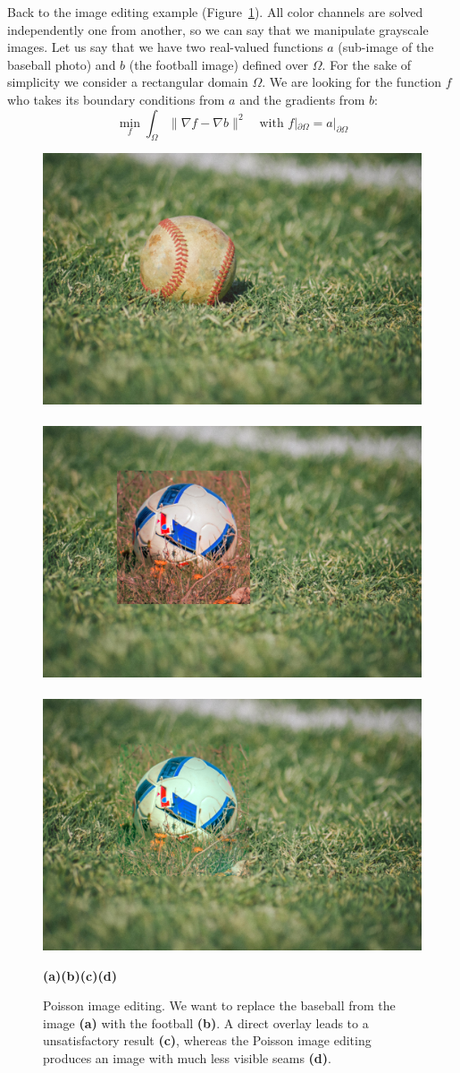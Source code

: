 \documentclass[notitlepage,oneside]{book}
\begin{document}
Back to the image editing example (Figure~\ref{fig:pie}). All color channels are solved independently one from another, so we can say that we manipulate grayscale images.
Let us say that we have two real-valued functions $a$ (sub-image of the baseball photo) and $b$ (the football image) defined over $\Omega$.
For the sake of simplicity we consider a rectangular domain $\Omega$.
We are looking for the function $f$ who takes its boundary conditions from $a$ and the gradients from $b$:
$$
\min\limits_{f} \int_\Omega \|\nabla f - \nabla b\|^2 \quad \text{with~} f|_{\partial\Omega} = a|_{\partial\Omega}
$$

\begin{figure}[b]
    \centering
    \includegraphics[width=.24\linewidth]{img/pie_baseball.png}~
    ~
    \includegraphics[width=.24\linewidth]{img/pie_overlay.png}~
    \includegraphics[width=.24\linewidth]{img/pie_poisson.png}
    \\
    \begin{flushleft}
    {\hspace{.18\linewidth}\textbf{(a)\hspace{.15\linewidth}(b)\hspace{.14\linewidth}(c)\hspace{.22\linewidth}(d)}}
    \end{flushleft}
    \caption{Poisson image editing. We want to replace the baseball from the image \textbf{(a)} with the football \textbf{(b)}. A direct overlay leads to a unsatisfactory result \textbf{(c)}, whereas the Poisson image editing produces an image with much less visible seams \textbf{(d)}.}
    \label{fig:pie}
\end{figure}
\end{document}

